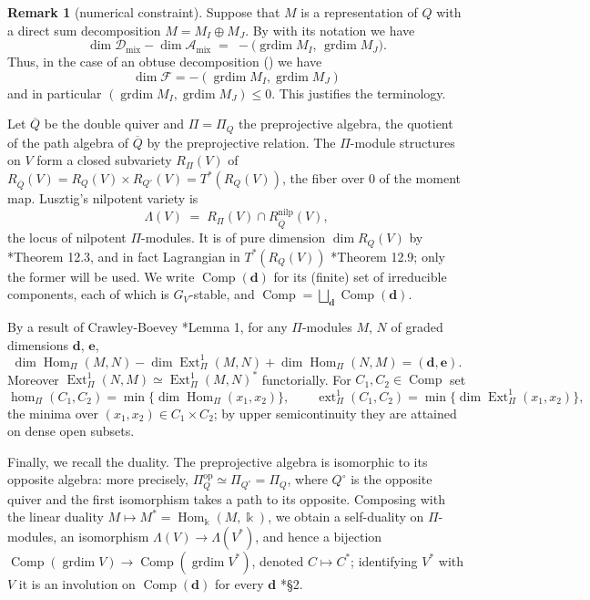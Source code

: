 \documentclass[12pt]{article}
\def\xspace{ }%
\theoremstyle{definition}
\newtheorem{remark}[remark]{Remark}
\newcommand{\obt}{obtuse\xspace}
\newcommand{\mix}{\mathrm{mix}}   %
\newcommand{\op}{\mathrm{op}}
\newcommand{\bd}{\boldsymbol{d}}  %
\newcommand{\be}{\boldsymbol{e}}
\newcommand{\Ext}{\operatorname{Ext}}
\newcommand{\ext}{\operatorname{ext}}
\newcommand{\Hom}{\operatorname{Hom}}
\newcommand{\grdim}{\operatorname{grdim}}
\newcommand{\Comp}{\operatorname{Comp}}
\newcommand{\cmp}{C}                       %
\newcommand{\kk}{\Bbbk}
\newcommand{\alg}{\mathcal{A}}   %
\newcommand{\bmdl}{\mathcal{D}}   %
\newcommand{\Ff}{\mathcal{F}}   %
\begin{document}
\begin{remark}[numerical constraint]\label{rem:numerical}
Suppose that $M$ is a representation of $Q$ with a direct sum decomposition $M=M_I\oplus M_J$.
By  with its notation we have
\[
   \dim\bmdl_{\mix} - \dim\alg_{\mix}
   \;=\; -\bigl(\grdim M_I,\, \grdim M_J\bigr).
\]
Thus, in the case of an \obt decomposition () we have
\[
\dim\Ff=-(\grdim M_I, \grdim M_J)
\]
and in particular  $(\grdim M_I, \grdim M_J)\le 0$. This justifies the terminology.
\end{remark}


Let $\overline{Q}$ be the double quiver and $\Pi = \Pi_Q$ the preprojective
algebra, the quotient of the path algebra of $\overline{Q}$ by the
preprojective relation. The $\Pi$-module structures on $V$ form a closed
subvariety $R_\Pi(V)$ of $R_{\overline{Q}}(V) = R_Q(V)\times R_{Q^\circ}(V) =
T^*(R_Q(V))$, the fiber over $0$ of the moment map. Lusztig's nilpotent
variety is
\[
   \Lambda(V) \;=\; R_\Pi(V)\cap R^{\mathrm{nilp}}_{\overline{Q}}(V),
\]
the locus of nilpotent $\Pi$-modules. It is of pure dimension $\dim R_Q(V)$
by \cite{MR1088333}*{Theorem 12.3}, and in fact Lagrangian in
$T^*(R_Q(V))$ \cite{MR1088333}*{Theorem 12.9}; only the former will be used. We
write $\Comp(\bd)$ for its (finite) set of irreducible components,
each of which is $G_V$-stable, and $\Comp = \bigsqcup_{\bd}
\Comp(\bd)$.

By a result of Crawley-Boevey \cite{MR1781930}*{Lemma 1}, for any
$\Pi$-modules $M$, $N$ of graded dimensions $\bd$,
$\be$,
\begin{equation}\label{eq:CB}
   \dim\Hom_\Pi(M,N) - \dim\Ext^1_\Pi(M,N) + \dim\Hom_\Pi(N,M) =
   (\bd,\be).
\end{equation}
Moreover $\Ext^1_\Pi(N,M) \simeq \Ext^1_\Pi(M,N)^*$ functorially. For $\cmp_1,
\cmp_2 \in \Comp$ set
\[
   \hom_\Pi(\cmp_1,\cmp_2) = \min\{\dim\Hom_\Pi(x_1,x_2)\},
   \qquad
   \ext^1_\Pi(\cmp_1,\cmp_2) = \min\{\dim\Ext^1_\Pi(x_1,x_2)\},
\]
the minima over $(x_1,x_2) \in \cmp_1\times \cmp_2$; by upper semicontinuity they
are attained on dense open subsets.

Finally, we recall the duality. The preprojective algebra is isomorphic to
its opposite algebra: more precisely, $\Pi_Q^{\op} \simeq
\Pi_{Q^\circ} = \Pi_Q$, where $Q^\circ$ is the opposite quiver and the first
isomorphism takes a path to its opposite. Composing with the linear duality
$M \mapsto M^* = \Hom_\kk(M,\kk)$, we obtain a self-duality on
$\Pi$-modules, an isomorphism $\Lambda(V) \to
\Lambda(V^*)$, and hence a bijection $\Comp(\grdim V) \to \Comp(\grdim V^*)$, denoted $\cmp
\mapsto \cmp^*$; identifying $V^*$ with $V$ it is an involution on
$\Comp(\bd)$ for every $\bd$
\cite{MR4847234}*{\S2}.
\end{document}
